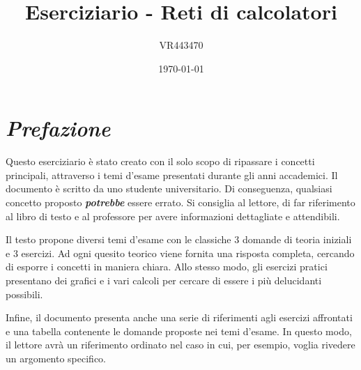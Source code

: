 \documentclass[a4paper]{article}
\begin{document}
	\author{VR443470}
	\title{Eserciziario - Reti di calcolatori}
	\date{\printdayoff\today}
	\maketitle
	
	\newpage
	\tableofcontents
	\newpage
	
	\section*{\emph{Prefazione}}
	Questo eserciziario è stato creato con il solo scopo di ripassare i concetti principali, attraverso i temi d'esame presentati durante gli anni accademici. Il documento è scritto da uno studente universitario. Di conseguenza, qualsiasi concetto proposto \emph{\textbf{potrebbe}} essere errato. Si consiglia al lettore, di far riferimento al libro di testo e al professore per avere informazioni dettagliate e attendibili.
	
	Il testo propone diversi temi d'esame con le classiche 3 domande di teoria iniziali e 3 esercizi. Ad ogni quesito teorico viene fornita una risposta completa, cercando di esporre i concetti in maniera chiara. Allo stesso modo, gli esercizi pratici presentano dei grafici e i vari calcoli per cercare di essere i più delucidanti possibili.
	
	Infine, il documento presenta anche una serie di riferimenti agli esercizi affrontati e una tabella contenente le domande proposte nei temi d'esame. In questo modo, il lettore avrà un riferimento ordinato nel caso in cui, per esempio, voglia rivedere un argomento specifico.\newline
	
\end{document}
